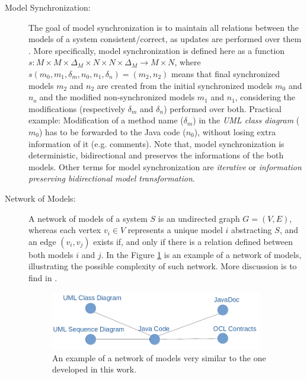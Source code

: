 \documentclass[tuberlin,cic,tc,english,noabntcite]{iiufrgs}
\begin{document}
\begin{description}
	\item[Model Synchronization:] The goal of model synchronization is to maintain all relations between the models of a system consistent/correct, as updates are performed over them \cite{diskin2011model}. More specifically, model synchronization is defined here as a function $s : M \times M \times \Delta_M \times N \times N \times \Delta_M \rightarrow M \times N $, where $s(m_0,m_1,\delta_m,n_0,n_1,\delta_n) = (m_2,n_2)$ means that final synchronized models $m_2$ and $n_2$ are created from the initial synchronized models $m_0$ and $n_o$ and the modified non-synchronized models $m_1$ and $n_1$, considering the modifications (respectively $\delta_m$ and $\delta_n$) performed over both. Practical example: Modification of a method name ($\delta_m$) in the \emph{UML class diagram} ($m_0$) has to be forwarded to the Java code ($n_0$), without losing extra information of it (e.g. comments). Note that, model synchronization is deterministic, bidirectional and preserves the informations of the both models. Other terms for model synchronization are \emph{iterative} or \emph{information preserving bidirectional model transformation}.

	\item[Network of Models:] A network of models of a system $S$ is an undirected graph $G = (V,E)$, whereas each vertex $v_i \in V$ represents a unique model $i$ abstracting $S$, and an edge $(v_i, v_j)$ exists if, and only if there is a relation defined between both models $i$ and $j$. In the Figure \ref{fig:network_example_01} is an example of a network of models, illustrating the possible complexity of such network. More discussion is to find in \citet{mens2006taxonomy}.

	\begin{figure}[H]
	    \caption{An example of a network of models very similar to the one developed in this work.}
	    \begin{center}
	        \includegraphics[width=25em]{network_example_01}   
	    \end{center}
	    \label{fig:network_example_01}
	\end{figure}


\end{description}
\end{document}
